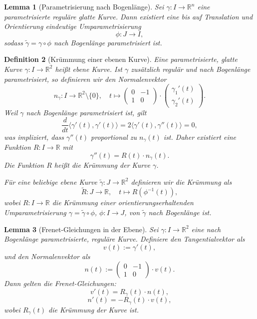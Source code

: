 \documentclass[a4paper,12pt]{article}
\theoremstyle{break}
\newtheorem{definition}{Definition}[section]
\newtheorem{lemma}[definition]{Lemma}
\begin{document}
\begin{lemma}[Parametrisierung nach Bogenlänge]
Sei \( \gamma: I \to \mathbb{R}^n \) eine parametrisierte reguläre glatte Kurve.  
Dann existiert eine bis auf Translation und Orientierung eindeutige Umparametrisierung  
\[
\phi: J \to I,
\]
sodass \( \tilde{\gamma} = \gamma \circ \phi \) nach Bogenlänge parametrisiert ist.
\end{lemma}

\begin{definition}[Krümmung einer ebenen Kurve]
Eine parametrisierte, glatte Kurve \( \gamma: I \to \mathbb{R}^2 \) heißt \emph{ebene Kurve}.  
Ist \( \gamma \) zusätzlich regulär und nach Bogenlänge parametrisiert, so definieren wir den \emph{Normalenvektor}  
\[
n_{\gamma}: I \to \mathbb{R}^2 \setminus \{0\}, \quad t \mapsto  
\begin{pmatrix} 0 & -1 \\ 1 & 0 \end{pmatrix} \cdot  
\begin{pmatrix} \gamma_1'(t) \\ \gamma_2'(t) \end{pmatrix}.
\]
Weil \( \gamma \) nach Bogenlänge parametrisiert ist, gilt  
\[
\frac{d}{dt} \langle \gamma'(t), \gamma'(t) \rangle = 2 \langle \gamma'(t), \gamma''(t) \rangle = 0,
\]
was impliziert, dass \( \gamma''(t) \) proportional zu \( n_{\gamma}(t) \) ist.  
Daher existiert eine Funktion \( R: I \to \mathbb{R} \) mit  
\[
\gamma''(t) = R(t) \cdot n_{\gamma}(t).
\]
Die Funktion \( R \) heißt die \emph{Krümmung} der Kurve \( \gamma \).  

Für eine beliebige ebene Kurve \( \tilde{\gamma}: J \to \mathbb{R}^2 \) definieren wir die Krümmung als  
\[
\tilde{R}: J \to \mathbb{R}, \quad t \mapsto R(\phi^{-1}(t)),
\]
wobei \( R: I \to \mathbb{R} \) die Krümmung einer orientierungserhaltenden Umparametrisierung  
\( \gamma = \tilde{\gamma} \circ \phi \), \( \phi: I \to J \), von \( \tilde{\gamma} \) nach Bogenlänge ist.
\end{definition}

\begin{lemma}[Frenet-Gleichungen in der Ebene]
Sei \( \gamma: I \to \mathbb{R}^2 \) eine nach Bogenlänge parametrisierte, reguläre Kurve.  
Definiere den Tangentialvektor als  
\[
v(t) := \gamma'(t),
\]
und den Normalenvektor als  
\[
n(t) := \begin{pmatrix} 0 & -1 \\ 1 & 0 \end{pmatrix} \cdot v(t).
\]
Dann gelten die \emph{Frenet-Gleichungen}:  
\[
v'(t) = R_{\gamma}(t) \cdot n(t),
\]
\[
n'(t) = -R_{\gamma}(t) \cdot v(t),
\]
wobei \( R_{\gamma}(t) \) die Krümmung der Kurve ist.
\end{lemma}
\end{document}
